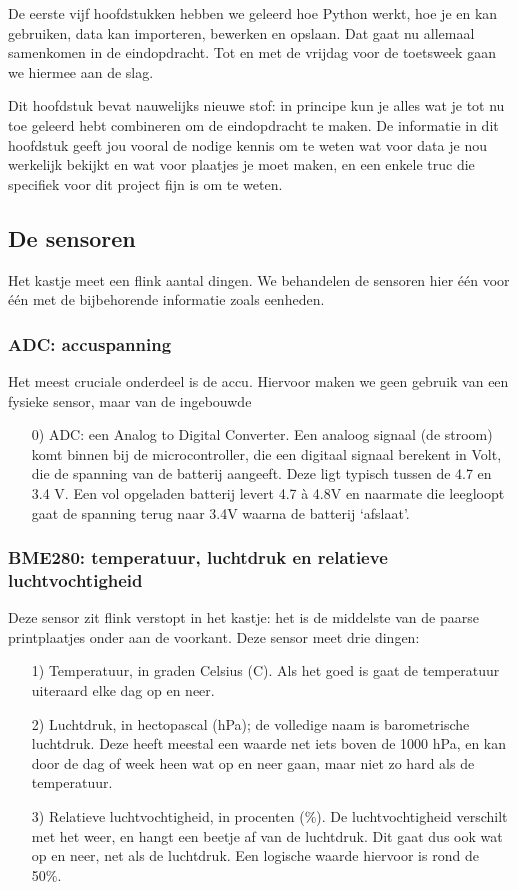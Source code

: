 \documentclass[a4paper,11pt, fleqn]{article}
\begin{document}
De eerste vijf hoofdstukken hebben we geleerd hoe Python werkt, hoe je  en  kan gebruiken, data kan importeren, bewerken en opslaan. Dat gaat nu allemaal samenkomen in de eindopdracht. Tot en met de vrijdag voor de toetsweek gaan we hiermee aan de slag.

Dit hoofdstuk bevat nauwelijks nieuwe stof: in principe kun je alles wat je tot nu toe geleerd hebt combineren om de eindopdracht te maken. De informatie in dit hoofdstuk geeft jou vooral de nodige kennis om te weten wat voor data je nou werkelijk bekijkt en wat voor plaatjes je moet maken, en een enkele truc die specifiek voor dit project fijn is om te weten.

\subsection{De sensoren}
Het kastje meet een flink aantal dingen. We behandelen de sensoren hier \'e\'en voor \'e\'en met de bijbehorende informatie zoals eenheden.

\subsubsection{ADC: accuspanning}
Het meest cruciale onderdeel is de accu. Hiervoor maken we geen gebruik van een fysieke sensor, maar van de ingebouwde
\begin{itemize}
	\item[0)] ADC: een Analog to Digital Converter. Een analoog signaal (de stroom) komt binnen bij de microcontroller, die een digitaal signaal berekent in Volt, die de spanning van de batterij aangeeft. Deze ligt typisch tussen de 4.7 en 3.4 V. Een vol opgeladen batterij levert 4.7 \`a 4.8V en naarmate die leegloopt gaat de spanning terug naar 3.4V waarna de batterij `afslaat'.
\end{itemize}

\subsubsection{BME280: temperatuur, luchtdruk en relatieve luchtvochtigheid}
Deze sensor zit flink verstopt in het kastje: het is de middelste van de paarse printplaatjes onder aan de voorkant. Deze sensor meet drie dingen:
\begin{itemize}
	\item[1)] Temperatuur, in graden Celsius (\textdegree C). Als het goed is gaat de temperatuur uiteraard elke dag op en neer.
	\item[2)] Luchtdruk, in hectopascal (hPa); de volledige naam is barometrische luchtdruk. Deze heeft meestal een waarde net iets boven de 1000 hPa, en kan door de dag of week heen wat op en neer gaan, maar niet zo hard als de temperatuur.
	\item[3)] Relatieve luchtvochtigheid, in procenten (\%). De luchtvochtigheid verschilt met het weer, en hangt een beetje af van de luchtdruk. Dit gaat dus ook wat op en neer, net als de luchtdruk. Een logische waarde hiervoor is rond de 50\%.
\end{itemize}
\end{document}
